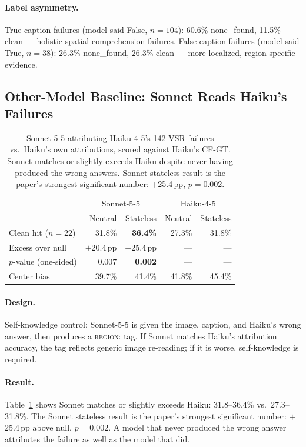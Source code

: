 \documentclass[11pt]{article}
\begin{document}
\paragraph{Label asymmetry.}
True-caption failures (model said False, $n{=}104$): 60.6\% none\_found,
11.5\% clean — holistic spatial-comprehension failures.
False-caption failures (model said True, $n{=}38$): 26.3\% none\_found,
26.3\% clean — more localized, region-specific evidence.

\subsection{Other-Model Baseline: Sonnet Reads Haiku's Failures}
\label{sec:sonnet}

\begin{table}[t]
\centering
\small
\begin{tabular}{lrrrr}
\toprule
 & \multicolumn{2}{c}{Sonnet-5-5} & \multicolumn{2}{c}{Haiku-4-5} \\
 & Neutral & Stateless & Neutral & Stateless \\
\midrule
Clean hit ($n{=}22$) & 31.8\% & \textbf{36.4\%} & 27.3\% & 31.8\% \\
Excess over null & $+$20.4\,pp & $+$25.4\,pp & — & — \\
$p$-value (one-sided) & 0.007 & \textbf{0.002} & — & — \\
Center bias & 39.7\% & 41.4\% & 41.8\% & 45.4\% \\
\bottomrule
\end{tabular}
\caption{Sonnet-5-5 attributing Haiku-4-5's 142 VSR failures vs.\ Haiku's
own attributions, scored against Haiku's CF-GT.
Sonnet matches or slightly exceeds Haiku despite never having produced the
wrong answers. Sonnet stateless result is the paper's strongest significant
number: $+$25.4\,pp, $p{=}0.002$.}
\label{tab:sonnet}
\end{table}

\paragraph{Design.}
Self-knowledge control: Sonnet-5-5 is given the image, caption, and
Haiku's wrong answer, then produces a \textsc{region:} tag.
If Sonnet matches Haiku's attribution accuracy, the tag reflects generic image
re-reading; if it is worse, self-knowledge is required.

\paragraph{Result.}
Table~\ref{tab:sonnet} shows Sonnet matches or slightly exceeds Haiku:
31.8--36.4\% vs.\ 27.3--31.8\%.
The Sonnet stateless result is the paper's strongest significant number:
$+$25.4\,pp above null, $p{=}0.002$.
A model that never produced the wrong answer attributes the failure as well as
the model that did.
\end{document}
